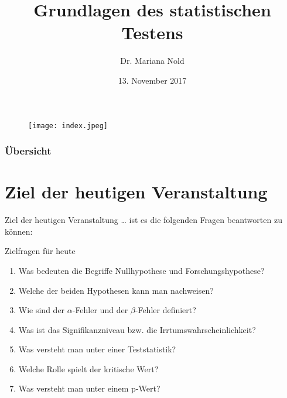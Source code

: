 \documentclass[usenames,dvipsnames,handout]{beamer}
\begin{document}
\author[Dr. Mariana Nold]{Dr. Mariana Nold}
 \date{}
\title [Grundlagen des statistischen Testens]{Grundlagen des statistischen Testens}
\date{13. November 2017}
\begin{frame}
\maketitle

  \begin{figure}[ht]
 	\centering
 	      \texttt{[image: index.jpeg]}
 	\end{figure}
\end{frame} 

\begin{frame}
  \frametitle{Übersicht}
  \tableofcontents
\end{frame}

\section{Ziel der heutigen Veranstaltung }
\begin{frame}{Ziel der heutigen Veranstaltung \dots}
ist es die folgenden Fragen beantworten zu können:
\begin{block}{Zielfragen für heute}
\begin{enumerate}
\item{Was bedeuten die Begriffe Nullhypothese und Forschungshypothese?}
\item{Welche der beiden Hypothesen kann man nachweisen?}
\item{Wie sind der $\alpha$-Fehler und der $\beta$-Fehler definiert?}
\item{Was ist das Signifikanzniveau bzw. die Irrtumswahrscheinlichkeit?}
\item{Was versteht man unter einer Teststatistik?}
\item{Welche Rolle spielt der kritische Wert?}
\item{Was versteht man unter einem p-Wert?}
\end{enumerate}
\end{block}
\end{frame}
\end{document}

